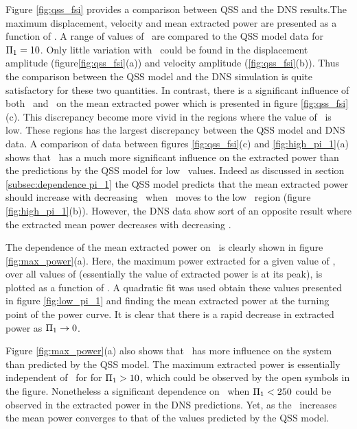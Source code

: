    

Figure \ref{fig:qss_fsi} provides a comparison between QSS and the DNS results.The maximum displacement, velocity and mean extracted power are presented as a function of \massdamp. A range of values of \massstiff\ are compared to the QSS model data for $\Pi_1 = 10$. Only little variation with \massstiff\ could be found in  the displacement amplitude (figure\ref{fig:qss_fsi}(a)) and velocity amplitude (\ref{fig:qss_fsi}(b)). Thus the comparison between the QSS model and the DNS simulation is quite satisfactory for these two quantities. In contrast, there is a significant influence of both \massstiff\ and \massdamp\ on the mean extracted power which is  presented in figure \ref{fig:qss_fsi}(c). This discrepancy become more vivid in the regions where the value of \massstiff\ is low. These regions has the largest discrepancy between the QSS model and DNS data. A comparison of data between figures \ref{fig:qss_fsi}(c) and \ref{fig:high_pi_1}(a) shows that \massstiff\ has a much more significant influence on the extracted power than the predictions by the QSS model for low \massstiff\ values. Indeed as discussed in section \ref{subsec:dependence pi_1} the QSS model predicts that the mean extracted power should increase with decreasing \massstiff\ when \massstiff\ moves to the low \massstiff\ region (figure \ref{fig:high_pi_1}(b)). However, the DNS data show sort of an opposite result where the extracted mean power decreases with decreasing \massstiff.






The dependence of the mean extracted power on \massstiff\ is clearly shown in figure \ref{fig:max_power}(a).  Here, the maximum power extracted for a given value of \massstiff, over all values of \massdamp (essentially the value of extracted power is at its peak), is plotted as a function of \massstiff. A quadratic fit was used obtain these values presented in figure \ref{fig:low_pi_1} and finding the mean extracted power at the turning point of the power curve. It is clear that there is a rapid decrease in extracted power as $\Pi_1 \rightarrow 0$. 



Figure \ref{fig:max_power}(a) also shows that \massstiff\ has more influence on the system  than predicted by the QSS model. The maximum extracted power is essentially independent of \massstiff\ for for $\Pi_1>10$, which could be observed by the open symbols in the figure. Nonetheless a significant dependence on \massstiff\, when  $\Pi_1<250$ could be observed in the extracted power in the DNS predictions. Yet, as the \massstiff\ increases the mean power converges to that of the values predicted by the QSS model.

